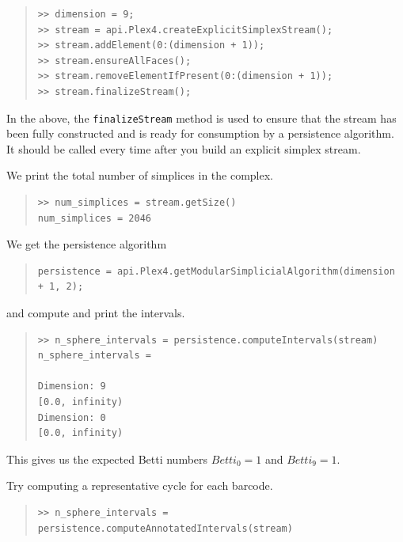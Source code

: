 \documentclass[amscd, amssymb, verbatim]{amsart}[12pt]
\theoremstyle{remark}
\theoremstyle{remark}
\theoremstyle{remark}
\begin{document}
\begin{quote} \begin{verbatim}
>> dimension = 9;
>> stream = api.Plex4.createExplicitSimplexStream();
>> stream.addElement(0:(dimension + 1));
>> stream.ensureAllFaces();
>> stream.removeElementIfPresent(0:(dimension + 1));
>> stream.finalizeStream();
\end{verbatim} \end{quote}

In the above, the \texttt{finalizeStream} method is used to ensure that the stream has been fully constructed and is ready for consumption by a persistence algorithm. It should be called every time after you build an explicit simplex stream. 

We print the total number of simplices in the complex.

\begin{quote} \begin{verbatim}
>> num_simplices = stream.getSize()
num_simplices = 2046
\end{verbatim} \end{quote}

We get the persistence algorithm

\begin{quote} \begin{verbatim}
persistence = api.Plex4.getModularSimplicialAlgorithm(dimension + 1, 2);
\end{verbatim} \end{quote}

and compute and print the intervals.

\begin{quote} \begin{verbatim}
>> n_sphere_intervals = persistence.computeIntervals(stream)
n_sphere_intervals =

Dimension: 9
[0.0, infinity)
Dimension: 0
[0.0, infinity)
\end{verbatim} \end{quote}

This gives us the expected Betti numbers $Betti_0=1$ and $Betti_9=1$.

Try computing a representative cycle for each barcode.

\begin{quote} \begin{verbatim}
>> n_sphere_intervals = persistence.computeAnnotatedIntervals(stream)
\end{verbatim} \end{quote}
\end{document}
